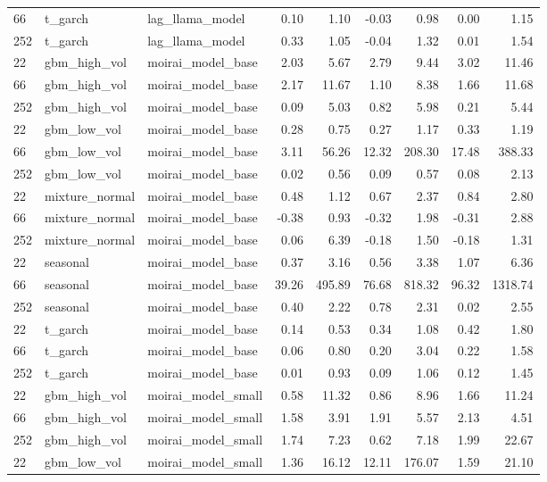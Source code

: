 {\begin{tabular}{lllrrrrrr}
66 & t\_garch & lag\_llama\_model & 0.10 & 1.10 & -0.03 & 0.98 & 0.00 & 1.15 \\
252 & t\_garch & lag\_llama\_model & 0.33 & 1.05 & -0.04 & 1.32 & 0.01 & 1.54 \\
\midrule
22 & gbm\_high\_vol & moirai\_model\_base & 2.03 & 5.67 & 2.79 & 9.44 & 3.02 & 11.46 \\
66 & gbm\_high\_vol & moirai\_model\_base & 2.17 & 11.67 & 1.10 & 8.38 & 1.66 & 11.68 \\
252 & gbm\_high\_vol & moirai\_model\_base & 0.09 & 5.03 & 0.82 & 5.98 & 0.21 & 5.44 \\
\midrule
22 & gbm\_low\_vol & moirai\_model\_base & 0.28 & 0.75 & 0.27 & 1.17 & 0.33 & 1.19 \\
66 & gbm\_low\_vol & moirai\_model\_base & 3.11 & 56.26 & 12.32 & 208.30 & 17.48 & 388.33 \\
252 & gbm\_low\_vol & moirai\_model\_base & 0.02 & 0.56 & 0.09 & 0.57 & 0.08 & 2.13 \\
\midrule
22 & mixture\_normal & moirai\_model\_base & 0.48 & 1.12 & 0.67 & 2.37 & 0.84 & 2.80 \\
66 & mixture\_normal & moirai\_model\_base & -0.38 & 0.93 & -0.32 & 1.98 & -0.31 & 2.88 \\
252 & mixture\_normal & moirai\_model\_base & 0.06 & 6.39 & -0.18 & 1.50 & -0.18 & 1.31 \\
\midrule
22 & seasonal & moirai\_model\_base & 0.37 & 3.16 & 0.56 & 3.38 & 1.07 & 6.36 \\
66 & seasonal & moirai\_model\_base & 39.26 & 495.89 & 76.68 & 818.32 & 96.32 & 1318.74 \\
252 & seasonal & moirai\_model\_base & 0.40 & 2.22 & 0.78 & 2.31 & 0.02 & 2.55 \\
\midrule
22 & t\_garch & moirai\_model\_base & 0.14 & 0.53 & 0.34 & 1.08 & 0.42 & 1.80 \\
66 & t\_garch & moirai\_model\_base & 0.06 & 0.80 & 0.20 & 3.04 & 0.22 & 1.58 \\
252 & t\_garch & moirai\_model\_base & 0.01 & 0.93 & 0.09 & 1.06 & 0.12 & 1.45 \\
\midrule
22 & gbm\_high\_vol & moirai\_model\_small & 0.58 & 11.32 & 0.86 & 8.96 & 1.66 & 11.24 \\
66 & gbm\_high\_vol & moirai\_model\_small & 1.58 & 3.91 & 1.91 & 5.57 & 2.13 & 4.51 \\
252 & gbm\_high\_vol & moirai\_model\_small & 1.74 & 7.23 & 0.62 & 7.18 & 1.99 & 22.67 \\
\midrule
22 & gbm\_low\_vol & moirai\_model\_small & 1.36 & 16.12 & 12.11 & 176.07 & 1.59 & 21.10 \\

\end{tabular}}
